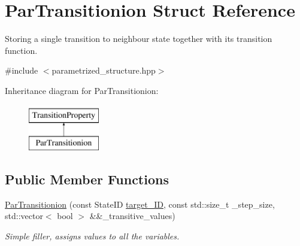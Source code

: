 \hypertarget{structParTransitionion}{\section{\-Par\-Transitionion \-Struct \-Reference}
\label{structParTransitionion}
}


\-Storing a single transition to neighbour state together with its transition function.  




{\ttfamily \#include $<$parametrized\-\_\-structure.\-hpp$>$}

\-Inheritance diagram for \-Par\-Transitionion\-:\begin{figure}[H]
\begin{center}
\leavevmode
\includegraphics[height=2.000000cm]{structParTransitionion}
\end{center}
\end{figure}
\subsection*{\-Public \-Member \-Functions}
\begin{DoxyCompactItemize}
\item 
\hypertarget{structParTransitionion_abf024116d00c3e74fd326d433647024c}{\hyperlink{structParTransitionion_abf024116d00c3e74fd326d433647024c}{\-Par\-Transitionion} (const \-State\-I\-D \hyperlink{structTransitionProperty_a1e272cf5a26a0db442ac0fed5b797386}{target\-\_\-\-I\-D}, const std\-::size\-\_\-t \-\_\-step\-\_\-size, std\-::vector$<$ bool $>$ \&\&\-\_\-transitive\-\_\-values)}\label{structParTransitionion_abf024116d00c3e74fd326d433647024c}

\begin{DoxyCompactList}\small\item\em \-Simple filler, assigns values to all the variables. \end{DoxyCompactList}\end{DoxyCompactItemize}
